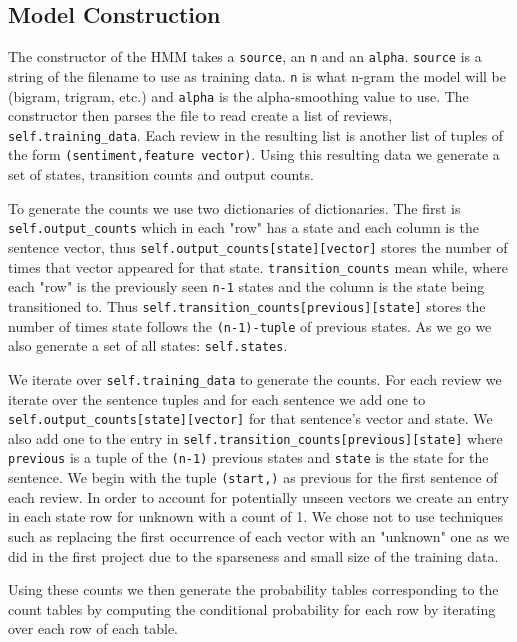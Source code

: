 \documentclass{article}
\begin{document}
\subsection{Model Construction}
The constructor of the HMM takes a \texttt{source}, an \texttt{n} and an \texttt{alpha}. \texttt{source} is a string of the filename to use as training data. \texttt{n} is what n-gram the model will be (bigram, trigram, etc.) and \texttt{alpha} is the alpha-smoothing value to use. The constructor then parses the file to read create a list of reviews, \texttt{self.training\_data}. Each review in the resulting list is another list of tuples of the form \texttt{(sentiment,feature vector)}. Using this resulting data we generate a set of states, transition counts and output counts.

To generate the counts we use two dictionaries of dictionaries. The first is \texttt{self.output\_counts} which in each "row" has a state and each column is the sentence vector, thus \texttt{self.output\_counts[state][vector]} stores the number of times that vector appeared for that state. \texttt{transition\_counts} mean while, where each "row" is the previously seen \texttt{n-1} states and the column is the state being transitioned to. Thus \texttt{self.transition\_counts[previous][state]} stores the number of times state follows the \texttt{(n-1)-tuple} of previous states. As we go we also generate a set of all states: \texttt{self.states}.

We iterate over \texttt{self.training\_data} to generate the counts. For each review we iterate over the sentence tuples and for each sentence we add one to \texttt{self.output\_counts[state][vector]} for that sentence's vector and state. We also add one to the entry in  \texttt{self.transition\_counts[previous][state]} where \texttt{previous} is a tuple of the \texttt{(n-1)} previous states and \texttt{state} is the state for the sentence. We begin with the tuple \texttt{(start,)} as previous for the first sentence of each review. In order to account for potentially unseen vectors we create an entry in each state row for unknown with a count of 1. We chose not to use techniques such as replacing the first occurrence of each vector with an "unknown" one as we did in the first project due to the sparseness and small size of the training data. 

Using these counts we then generate the probability tables corresponding to the count tables by computing the conditional probability for each row by iterating over each row of each table.
 
\end{document}
